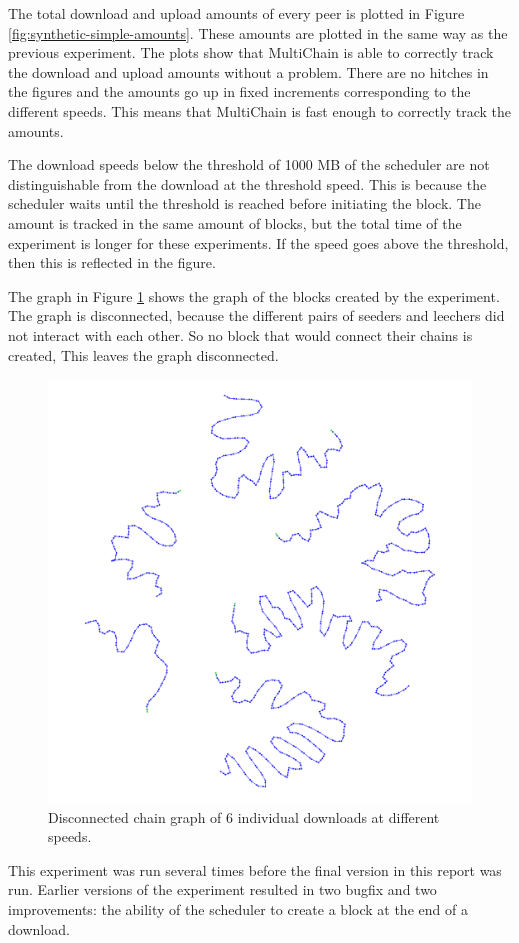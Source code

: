 The total download and upload amounts of every peer is plotted in Figure \ref{fig:synthetic-simple-amounts}.
These amounts are plotted in the same way as the previous experiment.
The plots show that MultiChain is able to correctly track the download and upload amounts without a problem.
There are no hitches in the figures and the amounts go up in fixed increments corresponding to the different speeds.
This means that MultiChain is fast enough to correctly track the amounts.

The download speeds below the threshold of 1000 MB of the scheduler
are not distinguishable from the download at the threshold speed.
This is because the scheduler waits until the threshold is reached before initiating the block.
The amount is tracked in the same amount of blocks,
but the total time of the experiment is longer for these experiments.
If the speed goes above the threshold, then this is reflected in the figure.

The graph in Figure \ref{fig:synthetic-simple-graph} shows the graph of the blocks created by the experiment.
The graph is disconnected, because the different pairs of seeders and leechers did not interact with each other.
So no block that would connect their chains is created,
This leaves the graph disconnected.

\begin{figure}
	\centerline{\includegraphics[scale=0.06]{experimentation/speeds/synthetic.png}}
	\caption{Disconnected chain graph of 6 individual downloads at different speeds.}
	\label{fig:synthetic-simple-graph}
\end{figure}

This experiment was run several times before the final version in this report was run.
Earlier versions of the experiment resulted in two bugfix and two improvements:
the ability of the scheduler to create a block at the end of a download.